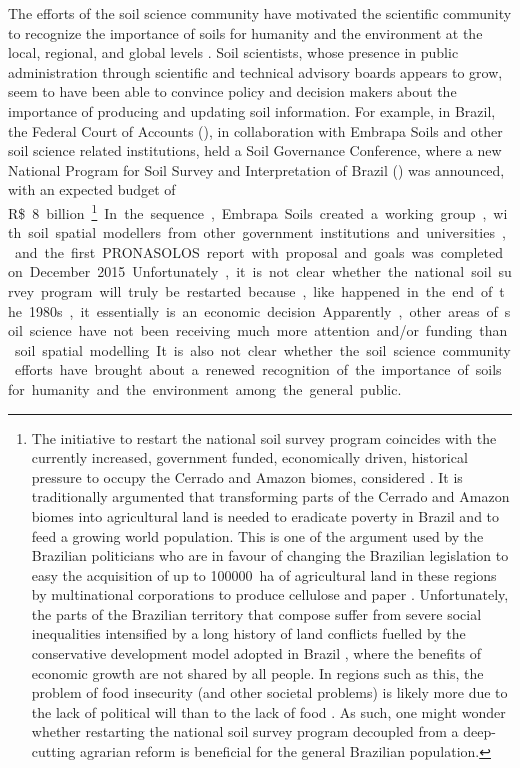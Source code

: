 \def\footpronassolos{\footnote{The initiative to restart the national soil survey program coincides with the 
currently increased, government funded, economically driven, historical pressure to occupy the Cerrado and 
Amazon biomes, considered \q{the last agricultural frontier} \cite{Correia2005, Macarini2005, Silva2005, 
CarvalhoEtAl2009, Batlle-BayerEtAl2010, MartinelliEtAl2010, SchneiderEtAl2015}. It is traditionally argumented 
that transforming parts of the Cerrado and Amazon biomes into agricultural land is needed to eradicate poverty 
in Brazil and to feed a growing world population. This is one of the argument used by the Brazilian 
politicians who are in favour of changing the Brazilian legislation to easy the acquisition of up to 
\SI{100000}{\hectare} of agricultural land in these regions by multinational corporations to produce cellulose 
and paper \cite{SECOM2015}. Unfortunately, the parts of the Brazilian territory that compose \q{the last 
agricultural frontier} suffer from severe social inequalities intensified by a long history of land conflicts 
fuelled by the conservative development model adopted in Brazil \cite{ComissaoPastoraldaTerra2015, 
SchneiderEtAl2015, Fernandes2016}, where the benefits of economic growth are not shared by all people. In 
regions such as this, the problem of food insecurity (and other societal problems) is likely more due to the 
lack of political will than to the lack of food \cite{FAO2005, FAO2009, FAO2015}. As such, one might wonder 
whether restarting the national soil survey program decoupled from a deep-cutting agrarian reform is beneficial
for the general Brazilian population.}}

The efforts of the soil science community have motivated the scientific community to recognize the importance 
of soils for humanity and the environment at the local, regional, and global levels \cite{SanchezEtAl2009, 
Kempen2011, OmutoEtAl2013}. Soil scientists, whose presence in public administration through scientific and 
technical advisory boards appears to grow, seem to have been able to convince policy and decision makers about 
the importance of producing and updating soil information. For example, in Brazil, the Federal Court of 
Accounts (\tcu), in collaboration with Embrapa Soils and other soil science related institutions, held a Soil 
Governance Conference, where a new National Program for Soil Survey and Interpretation of Brazil (\pronassolos)
was announced, with an expected budget of \SI{8}[R\$]~billion\footpronassolos. In the sequence, Embrapa Soils 
created a working group, with soil spatial modellers from other government institutions and universities, and 
the first PRONASOLOS report with proposal and goals was completed on December 2015. Unfortunately, it is not 
clear whether the national soil survey program will truly be restarted because, like happened in the end of the
1980s, it essentially is an economic decision. Apparently, other areas of soil science have not been receiving 
much more attention and/or funding than soil spatial modelling. It is also not clear whether the soil science 
community efforts have brought about a renewed recognition of the importance of soils for humanity and the 
environment among the general public.

